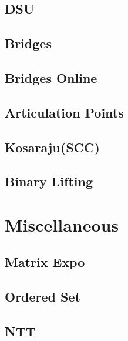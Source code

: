 \documentclass[a4paper, twocolumn]{article}
\begin{document}
\subsection{DSU}

\subsection{Bridges}

\subsection{Bridges Online}

\subsection{Articulation Points}

\subsection{Kosaraju(SCC)}

\subsection{Binary Lifting}



\section{Miscellaneous}
\subsection{Matrix Expo}

\subsection{Ordered Set}

\subsection{NTT}

\end{document}
